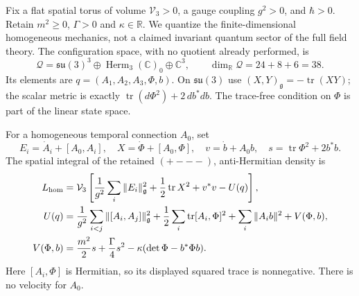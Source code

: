 Fix a flat spatial torus of volume \(\mathcal V_3>0\), a gauge coupling
\(g^2>0\), and \(\hbar>0\). Retain \(m^2\geq0\), \(\Gamma>0\) and
\(\kappa\in\mathbb R\). We quantize the finite-dimensional homogeneous
mechanics, not a claimed invariant quantum sector of the full field theory.
The configuration space, with no quotient already performed, is
\[
 \mathcal Q=\mathfrak{su}(3)^3\oplus
       \operatorname{Herm}_3(\mathbb C)_0\oplus\mathbb C^3,
 \qquad \dim_{\mathbb R}\mathcal Q=24+8+6=38.
\]
Its elements are \(q=(A_1,A_2,A_3,\Phi,b)\). On \(\mathfrak{su}(3)\)
use \((X,Y)_{\mathfrak g}=-\operatorname{tr}(XY)\); the scalar metric is
exactly \(\operatorname{tr}(d\Phi^2)+2\,db^*db\).
The trace-free condition on \(\Phi\) is part of the linear state space.

For a homogeneous temporal connection \(A_0\), set
\[
 E_i=\dot A_i+[A_0,A_i],\quad
 X=\dot\Phi+[A_0,\Phi],\quad v=\dot b+A_0b,\quad
 s=\operatorname{tr}\Phi^2+2b^*b.
\]
The spatial integral of the retained \((+---)\), anti-Hermitian density is
\begin{align}
 L_{\rm hom}&=\mathcal V_3\left[
   \frac1{g^2}\sum_i\|E_i\|_{\mathfrak g}^2
      +\frac12\operatorname{tr}X^2+v^*v-U(q)\right],
       \label{qh:hq-L}\\
 U(q)&=\frac1{g^2}\sum_{i<j}\|[A_i,A_j]\|_{\mathfrak g}^2
       +\frac12\sum_i\operatorname{tr}[A_i,\Phi]^2
       +\sum_i\|A_i b\|^2+V(\Phi,b),\notag\\
 V(\Phi,b)&=\frac{m^2}{2}s+\frac{\Gamma}{4}s^2
                      -\kappa(\det\Phi-b^*\Phi b).\notag
\end{align}
Here \([A_i,\Phi]\) is Hermitian, so its displayed squared trace is
nonnegative. There is no velocity for \(A_0\).

